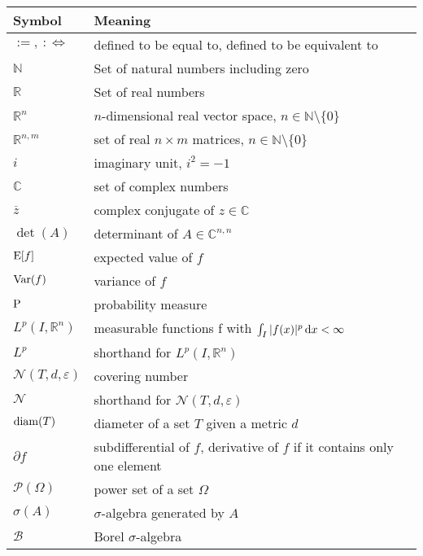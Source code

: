 \begin{center}
    \begin{tabular}{ll}
        Symbol & Meaning \\ 
        \hline
        $:=,~ :\Leftrightarrow$ & defined to be equal to, defined to be equivalent to \\
        $\mathbb{N}$ & Set of natural numbers including zero \\
        $\mathbb{R}$ & Set of real numbers \\
        $\mathbb{R}^n$ & $n$-dimensional real vector space, $n\in \mathbb{N}\setminus\{0\}$ \\
        $\mathbb{R}^{n,m}$ & set of real $n\times m$ matrices, $n\in \mathbb{N}\setminus\{0\}$ \\
        $i$ & imaginary unit, $i^2 = -1$ \\
        $\mathbb{C}$ & set of complex numbers \\
        $\overline{z}$ & complex conjugate of $z \in \mathbb{C}$\\
        $\det(A)$ & determinant of $A \in \mathbb{C}^{n,n}$ \\
        $\operatorname*{E}[f]$ & expected value of $f$ \\
        $\operatorname{Var}(f)$ & variance of $f$ \\
        $\mathrm{P}$ & probability measure \\
        $L^p(I,\mathbb{R}^n)$ & measurable functions f with $ \int_I \vert f(x)\vert^{p} \,\mathrm{d} x <\infty$\\
        $L^p$ & shorthand for $L^p(I,\mathbb{R}^n)$ \\
        $\mathcal{N}(T,d,\varepsilon)$ & covering number\\
        $\mathcal{N}$ & shorthand for $\mathcal{N}(T,d,\varepsilon)$\\
        $\operatorname{diam}(T)$ & diameter of a set $T$ given a metric $d$\\
        $\partial f$ & subdifferential of $f$, derivative of $f$ if it contains only one element\\
        $\mathcal{P}(\Omega)$ & power set of a set $\Omega$\\
        $\sigma(A)$ & $\sigma$-algebra generated by $A$ \\
        $\mathcal{B}$ & Borel $\sigma$-algebra
    \end{tabular}
\end{center}




